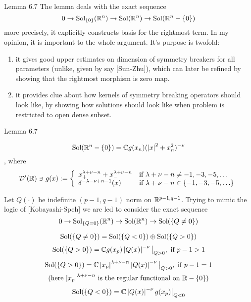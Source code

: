 \documentclass[8pt]{beamer}
\newcommand{\Sol}{\mbox{Sol}}
\theoremstyle{mystyle}
\begin{document}
\begin{frame}{Lemma 6.7}
	The lemma deals with the exact sequence
	\[0\rightarrow \Sol_{\mycbra{0}}(\R^n)\rightarrow \Sol(\R^n)\rightarrow\Sol(\R^n-\mycbra{0})\]
	more precisely, it explicitly constructs basis for the rightmost term.
In my opinion, it is important to the whole argument. It's purpose is twofold:
\begin{enumerate}
	\item it gives good upper estimates on dimension of symmetry breakers for all parameters (unlike, given by say [Sun-Zhu]),
		which can later be refined by showing that the rightmost morphism is zero map.
	\item it provides clue about how kernels of symmetry breaking operators should look like, by showing how solutions should
		look like when problem is restricted to open dense subset.
\end{enumerate}
\end{frame}
\begin{frame}{Lemma 6.7}
\begin{theorem}
	\[\Sol(\R^n-\mycbra{0})=\C g(x_n)(\myabs{x}^2+x_n^2)^{-\nu}\], where
	\[\mathcal{D}'(\mathbb{R})\ni g(x):=\left\{\begin{array}{ll}
				x_+^{\lambda+\nu-n}+x_-^{\lambda+\nu-n}&\mbox{if }\lambda+\nu-n\neq-1,-3,-5,\hdots\\
				\delta^{-\lambda-\nu+n-1}(x)&\mbox{if }\lambda+\nu-n\in\left\{-1,-3,-5,\hdots\right\}\\
		\end{array}\right.\]
\end{theorem}
Let $Q(\cdot)$ be indefinite $(p-1,q-1)$ norm on $\mathbb{R}^{p-1,q-1}$.  
Trying to mimic the logic of [Kobayashi-Speh] we are led to consider the exact sequence
\[0\rightarrow \Sol_{\mycbra{Q=0}}(\R^n)\rightarrow \Sol(\R^n)\rightarrow\Sol(
	\mycbra{Q\neq0})\]
\begin{theorem}[$O(p,q),\;n:=(p-1)+(q-1)$]
	\[\Sol(\mycbra{Q\neq0})=\Sol(\mycbra{Q<0})\oplus \Sol(\mycbra{Q>0})\]
	\[\Sol(\mycbra{Q>0})=\C g(x_p)\myabs{Q(x)}^{-\nu}\big|_{Q>0},\mbox{ if }p-1>1\]
	\begin{multline*}\Sol(\mycbra{Q>0})=\C \myabs{x_p}^{\lambda+\nu-n}\myabs{Q(x)}^{-\nu}\big|_{Q>0},\mbox{ if }p-1=1\\
	\mbox{(here $\myabs{x_p}^{\lambda+\nu-n}$ is the regular functional on $\R-\mycbra{0}$)}\end{multline*}
	\[\Sol(\mycbra{Q<0})=\C\myabs{Q(x)}^{-\nu}g(x_p)\big|_{Q<0}\]
\end{theorem}
\end{frame}
\end{document}
